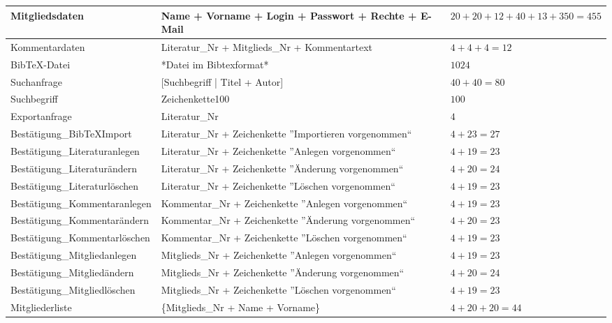 \begin{longtable}{|l|p{6.0cm}|p{2cm}|}
Mitgliedsdaten & Name + Vorname + Login + Passwort + Rechte + E-Mail& $20 + 20 + 12 + 40 + 13 + 350 = 455 $\\
\hline
Kommentardaten & Literatur\_Nr + Mitglieds\_Nr + Kommentartext & $4 + 4 + 4 = 12 $ \\
\hline
BibTeX-Datei & *Datei im Bibtexformat* & $1024$\\
\hline
Suchanfrage & [Suchbegriff | Titel + Autor] & $40+40=80$\\
\hline
Suchbegriff & Zeichenkette100 & $100 $ \\
\hline
Exportanfrage & Literatur\_Nr & $4 $ \\
\hline\hline

Bestätigung\_BibTeXImport & Literatur\_Nr + Zeichenkette ''Importieren vorgenommen`` & $4 + 23 = 27 $\\
\hline
Bestätigung\_Literaturanlegen & Literatur\_Nr + Zeichenkette ''Anlegen vorgenommen`` & $4 + 19 = 23 $\\
\hline
Bestätigung\_Literaturändern & Literatur\_Nr + Zeichenkette ''Änderung vorgenommen`` & $4 + 20 = 24$ \\
\hline
Bestätigung\_Literaturlöschen & Literatur\_Nr + Zeichenkette ''Löschen vorgenommen`` & $4 + 19 = 23 $\\
\hline
Bestätigung\_Kommentaranlegen & Kommentar\_Nr + Zeichenkette ''Anlegen vorgenommen`` & $4 + 19 = 23 $\\
\hline
Bestätigung\_Kommentarändern & Kommentar\_Nr + Zeichenkette ''Änderung vorgenommen`` & $4 + 20 = 23$\\
\hline
Bestätigung\_Kommentarlöschen & Kommentar\_Nr + Zeichenkette ''Löschen vorgenommen`` & $4 + 19 = 23$ \\
\hline
Bestätigung\_Mitgliedanlegen & Mitglieds\_Nr + Zeichenkette ''Anlegen vorgenommen`` & $4 + 19 = 23 $ \\
\hline
Bestätigung\_Mitgliedändern & Mitglieds\_Nr + Zeichenkette ''Änderung vorgenommen`` & $4 + 20 = 24$\\
\hline
Bestätigung\_Mitgliedlöschen & Mitglieds\_Nr + Zeichenkette ''Löschen vorgenommen`` & $4 + 19 = 23$\\
\hline
Mitgliederliste & \{Mitglieds\_Nr + Name + Vorname\} & $4 + 20 + 20 = 44 $\\
\hline
\end{longtable}


